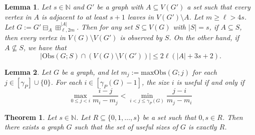 \documentclass[10pt,a4paper]{amsart}
\newtheorem{lemma}{Lemma}
\newtheorem{theorem}{Theorem}
\begin{document}
        \begin{lemma}\label{lemma bounded observence in grids}
            Let $s\in \mathbb{N}$ and $G'$ be a graph with $A\subseteq V(G')$ a set such that every vertex in $A$ is adjacent to at least $s+1$ leaves in $V(G')\setminus A$.
            Let $m\geq \ell>4s$.
            Let $G:=G'\boxminus_A\boxplus_{\ell,2m}^{|A|}$.
            Then for any set $S\subseteq V(G)$ with $|S|=s$, if $A\subseteq S$, then every vertex in $V(G)\setminus V(G')$ is observed by $S$.
            On the other hand,
            if $A\not\subseteq S$,
            we have that
            \[ |\mathrm{Obs}(G;S)\cap (V(G)\setminus V(G'))|\leq 2\ell(|A|+3s+2). \]
            
        \end{lemma}

        \begin{lemma}\label{lemma characterization of beta good sizes}
            Let $G$ be a graph, and let $m_j:=\mathrm{maxObs}(G;j)$ for each $j\in [\gamma_P]\cup\{0\}$.
            For each $i\in [\gamma_P(G)-1]$, the size $i$ is useful if and only if
                \[ 
                \max_{0\leq j<i}\frac{i-j}{m_i-m_j}< \min_{i<j\leq \gamma_P(G)}\frac{j-i}{m_j-m_i}
                 \]
        \end{lemma}

        \begin{theorem}\label{theorem every set realizable}
            Let $s\in \mathbb{N}$.
            Let $R\subseteq \{0,1,\dots,s\}$ be a set such that $0,s\in R$.
            Then there exists a graph $G$ such that the set of useful sizes of $G$ is exactly $R$.
        \end{theorem}
\end{document}
